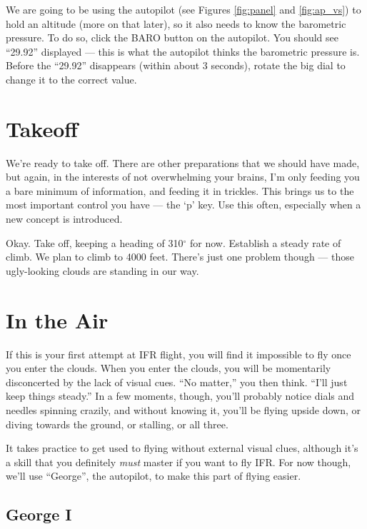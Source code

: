 We are going to be using the autopilot (see Figures \ref{fig:panel}
and \ref{fig:ap_vs}) to hold an altitude (more on that later), so it
also needs to know the barometric pressure.  To do so, click the BARO
button on the autopilot.  You should see ``29.92'' displayed --- this
is what the autopilot thinks the barometric pressure is.  Before the
``29.92'' disappears (within about 3 seconds), rotate the big dial to
change it to the correct value.

\section{Takeoff}

We're ready to take off.  There are other preparations that we should
have made, but again, in the interests of not overwhelming your
brains, I'm only feeding you a bare minimum of information, and
feeding it in trickles.  This brings us to the most important control
you have --- the `p' key.  Use this often, especially when a new
concept is introduced.

Okay.  Take off, keeping a heading of 310$^\circ$ for
now.  Establish
a steady rate of climb.  We plan to climb to 4000 feet.  There's just
one problem though --- those ugly-looking clouds are standing in our
way.

\section{In the Air}

If this is your first attempt at IFR flight, you will find it
impossible to fly once you enter the clouds.  When you enter the
clouds, you will be momentarily disconcerted by the lack of visual
cues.  ``No matter,'' you then think.  ``I'll just keep things
steady.''  In a few moments, though, you'll probably notice dials and
needles spinning crazily, and without knowing it, you'll be flying
upside down, or diving towards the ground, or stalling, or all three.

It takes practice to get used to flying without external visual clues,
although it's a skill that you definitely \emph{must} master if you
want to fly IFR.  For now though, we'll use ``George'', the autopilot,
to make this part of flying easier.

\subsection{George I}

